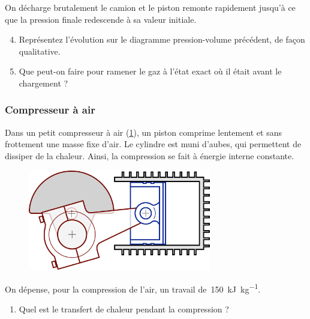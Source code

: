 	On décharge brutalement le camion et le piston remonte rapidement jusqu’à ce que la pression finale redescende à sa valeur initiale.
	
	\begin{enumerate}
		\setcounter{enumi}{3}
		\item Représentez l’évolution sur le diagramme pression-volume précédent, de façon qualitative.
		\item Que peut-on faire pour ramener le gaz à l’état exact où il était avant le chargement ?
	\end{enumerate}


\subsubsection{Compresseur à air}
\label{exo_compresseur_air}

	Dans un petit compresseur à air (\cref{fig_compresseur}), un piston comprime lentement et sans frottement une masse fixe d’air. Le cylindre est muni d’aubes, qui permettent de dissiper de la chaleur. Ainsi, la compression se fait à énergie interne constante.	

	\begin{figure}
	\begin{center}
		\includegraphics[width=8cm]{images/compresseur_air.png}
	\end{center}
	\label{fig_compresseur}
	\end{figure}

	On dépense, pour la compression de l’air, un travail de~\SI{150}{\kilo\joule\per\kilogram}. 
		
	\begin{enumerate}
		\item Quel est le transfert de chaleur pendant la compression ?
	\end{enumerate}
	
